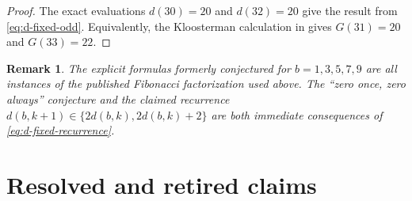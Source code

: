 \documentclass[a4paper]{article}
\newtheorem{remark}[theorem]{Remark}
\begin{document}
\begin{proof}
	The exact evaluations $d(30)=20$ and $d(32)=20$ give the result from
	\eqref{eq:d-fixed-odd}.  Equivalently, the Kloosterman calculation in
	 gives $G(31)=20$ and
	$G(33)=22$.
\end{proof}

\begin{remark}
	The explicit formulas formerly conjectured for $b=1,3,5,7,9$ are all
	instances of the published Fibonacci factorization used above.
	The ``zero once, zero always'' conjecture and the claimed recurrence
	$d(b,k+1)\in\{2d(b,k),2d(b,k)+2\}$ are both immediate consequences of
	\eqref{eq:d-fixed-recurrence}.
\end{remark}

\section{Resolved and retired claims}
\end{document}
